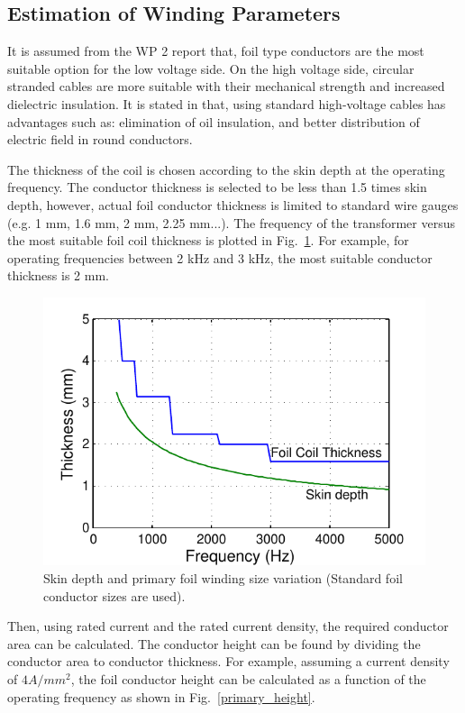\documentclass[a4paper, 11pt]{article} %
\begin{document}
\subsection{Estimation of Winding Parameters}

It is assumed from the WP 2 report that, foil type conductors are the most suitable option for the low voltage side. On the high voltage side, circular stranded cables are more suitable with their mechanical strength and increased dielectric insulation. It is stated in \cite{Morren2002} that, using standard high-voltage cables has advantages such as: elimination of oil insulation, and better distribution of electric field in round conductors. 

The thickness of the coil is chosen according to the skin depth at the operating frequency. The conductor thickness is selected to be less than 1.5 times skin depth, however, actual foil conductor thickness is limited to standard wire gauges (e.g. 1 mm, 1.6 mm, 2 mm, 2.25 mm...). The frequency of the transformer versus the most suitable foil coil thickness is plotted in Fig.~\ref{primary_thickness}. For example, for operating frequencies between 2 kHz and 3 kHz, the most suitable conductor thickness is 2 mm.


\begin{figure}[]
  \centering
    \includegraphics[]{primary_thickness}
  \caption{Skin depth and primary foil winding size variation (Standard foil conductor sizes are used).}
  \label{primary_thickness}
\end{figure}


Then, using rated current and the rated current density, the required conductor area can be calculated. The conductor height can be found by dividing the conductor area to conductor thickness. For example, assuming a current density of $4 A/mm^2$, the foil conductor height can be calculated as a function of the operating frequency as shown in Fig.~\ref{primary_height}.
\end{document}

